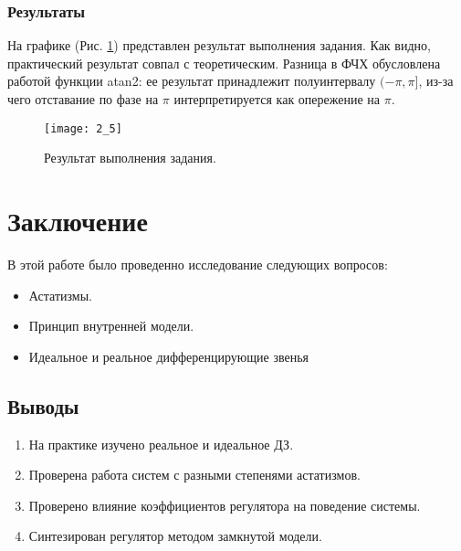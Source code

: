 \documentclass[16pt]{article}
\begin{document}
\subsubsection{Результаты}
На графике (Рис. \ref*{fig:fig5}) представлен результат выполнения задания. Как видно, практический результат совпал с теоретическим. Разница в ФЧХ обусловлена работой функции atan2: ее результат принадлежит полуинтервалу \((-\pi, \pi]\), из-за чего отставание по фазе на \(\pi\) интерпретируется как опережение на \(\pi\).
\begin{figure}[h!]
    \centering
    \texttt{[image: 2\_5]}
    \caption{Результат выполнения задания.}
    \label{fig:fig5}
\end{figure}










\newpage
\section{Заключение}
В этой работе было проведенно исследование следующих вопросов:
\begin{itemize}
    \item Астатизмы.
    \item Принцип внутренней модели.
    \item Идеальное и реальное дифференцирующие звенья
\end{itemize} 
\subsection{Выводы}
\begin{enumerate}
   \item На практике изучено реальное и идеальное ДЗ.
   \item Проверена работа систем с разными степенями астатизмов. 
   \item Проверено влияние коэффициентов регулятора на поведение системы.
   \item Синтезирован регулятор методом замкнутой модели.
\end{enumerate}
\end{document}
